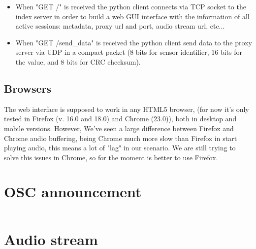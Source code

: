 \documentclass{article}
\begin{document}
 \begin{itemize}
	\item{When "GET /" is received the python client connects via TCP socket to the index server in order to build a web GUI interface with the information of all active sessions: metadata, proxy url and port, audio stream url, etc...}
	\item{When "GET /send\_data" is received the python client send data to the proxy server via UDP in a compact packet (8 bits for sensor identifier, 16 bits for the value, and 8 bits for CRC checksum).}
 \end{itemize}

\subsection{Browsers}
The web interface is supposed to work in any HTML5 browser, (for now it's only tested in Firefox (v. 16.0 and 18.0) and Chrome (23.0)), both in desktop and mobile versions. However, We've seen a large difference between Firefox and Chrome audio buffering, being Chrome much more slow than Firefox in start playing audio, this means a lot of "lag" in our scenario. We are still trying to solve this issues in Chrome, so for the moment is better to use Firefox.

\section{OSC announcement}
\label{sec:announcement}
\begin{Verbatim}[commandchars=\\\{\}]

\end{Verbatim}

\section{Audio stream}
\label{sec:streaming}
\begin{Verbatim}[commandchars=\\\{\}]

\end{Verbatim}
\end{document}
